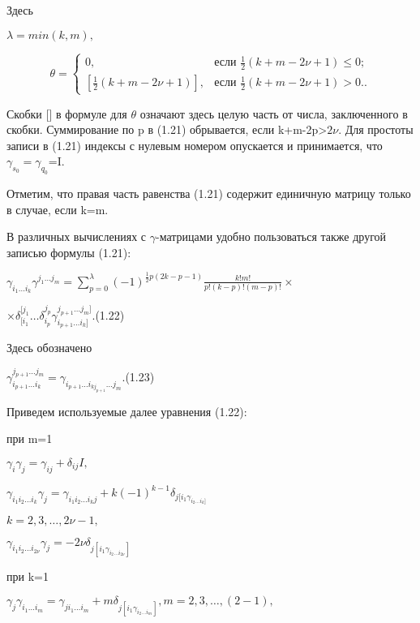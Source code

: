\documentclass{article}
\begin{document}
{Здесь\par
$\lambda=min(k,m),$\par
$$
\theta=\begin{cases}
0,&\text{если $\frac{1}{2}(k+m-2\nu+1)\le0$;}\\
[\frac{1}{2}(k+m-2\nu+1)],&\text{если $\frac{1}{2}(k+m-2\nu+1)>0.$.}
\end{cases}
$$
\par
\hspace{0.2cm}
Скобки [] в формуле для $\theta$ означают здесь целую часть от числа, заключенного в скобки. Суммирование по p в (1.21) обрывается, если k+m-2p>$2\nu$. Для простоты записи в (1.21) индексы с нулевым номером опускается и принимается, что $\gamma_{s_0}=\gamma_{q_0}$=I.\par
Отметим, что правая часть равенства (1.21) содержит единичную матрицу только в случае, если k=m.\par
В различных вычислениях с $\gamma$-матрицами удобно пользоваться также другой записью формулы (1.21):\par
$\gamma_{i_1 \dots i_k}\gamma^{j_1 \dots j_m}=\sum_{p=0}^{\lambda}(-1)^{\frac{1}{2}p(2k-p-1)}\frac{k!m!}{p!(k-p)!(m-p)!}\times$\par
\begin{center}
$\times\delta_{[i_1}^{[j_1}\dots\delta_{i_p}^{j_p}\gamma_{i_{p+1}\dots i_k]}^{j_{p+1}\dots j_m]}.$(1.22) \par
\end{center}
Здесь обозначено\par
\begin{center}
$\gamma_{i_{p+1}\dots i_k}^{j_{p+1}\dots j_m}=\gamma_{i_{p+1} \dots i_{kj_{p+1}} \dots j_m}$.(1.23)
\end{center}\par
Приведем используемые далее уравнения (1.22):\par
при m=1\par
\begin{center}
$\gamma_{i}\gamma_{j}=\gamma_{ij}+\delta_{ij}I,$\par
$\gamma_{i_1 i_2 \dots i_k}\gamma_{j}=\gamma_{i_1 i_2 \dots i_k j}+k(-1)^{k-1}\delta_{j[i_1\gamma_{i_2 \dots i_k]}}\,$\par
$k=2,3,\dots,2\nu-1,$\par
$\gamma_{i_1 i_2 \dots i_{2\nu}}\gamma_{j}=-2\nu\delta_{j[i_1\gamma_{i_2 \dots i_{2\nu}}]}$\par
\end{center}
при k=1\par
$\gamma_{j}\gamma_{i_1 \dots i_m}=\gamma_{j i_1 \dots i_m}+m\delta_{j[i_1\gamma_{i_2 \dots i_m}]}, m=2,3,\dots,(2-1),$\par
}
\end{document}
